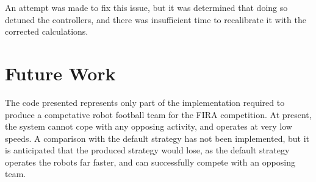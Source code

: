 \documentclass[10pt]{article} \usepackage[a4paper]{geometry}
\begin{document}
An attempt was made to fix this issue, but it was determined that doing so
detuned the controllers, and there was insufficient time to recalibrate it with
the corrected calculations.

\section{Future Work}

The code presented represents only part of the implementation required to
produce a competative robot football team for the \ac{FIRA} competition.  At
present, the system cannot cope with any opposing activity, and operates at very
low speeds.  A comparison with the default strategy has not been implemented,
but it is anticipated that the produced strategy would lose, as the default
strategy operates the robots far faster, and can successfully compete with an
opposing team.

\cleardoublepage{}

\end{document}
